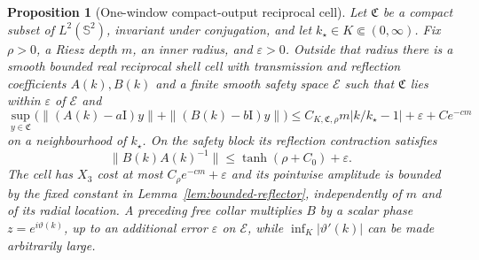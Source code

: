 \documentclass[11pt]{article}
\newtheorem{proposition}[theorem]{Proposition}
\theoremstyle{remark}
\newcommand{\Id}{\mathrm I}
\begin{document}
\begin{proposition}[One-window compact-output reciprocal cell]
\label{prop:one-window-cell}
Let $\mathfrak C$ be a compact subset of
$L^2(\mathbb S^2)$, invariant under conjugation, and let
$k_\star\in K\Subset(0,\infty)$.  Fix $\rho>0$, a Riesz depth $m$, an inner
radius, and $\varepsilon>0$.  Outside that radius there is a smooth bounded
real reciprocal shell cell with transmission and reflection coefficients
$A(k),B(k)$ and a finite smooth safety space $\mathcal E$ such that
$\mathfrak C$ lies within $\varepsilon$ of $\mathcal E$ and
\begin{equation}
 \sup_{y\in\mathfrak C}
 \bigl(\|(A(k)-a\Id)y\|+\|(B(k)-b\Id)y\|\bigr)
 \leq C_{K,\mathfrak C,\rho}m|k/k_\star-1|
       +\varepsilon+Ce^{-cm}
 \label{eq:one-window-residual}
\end{equation}
on a neighbourhood of $k_\star$.  On the safety block its reflection
contraction satisfies
\begin{equation}
 \|B(k)A(k)^{-1}\|
 \leq\tanh(\rho+C_0)+\varepsilon.
 \label{eq:one-window-reflection-gap}
\end{equation}
The cell has $X_3$ cost at most $C_\rho e^{-cm}+\varepsilon$ and its
pointwise amplitude is bounded by the fixed constant in
Lemma~\ref{lem:bounded-reflector}, independently of $m$ and of its radial
location.  A preceding free collar multiplies $B$ by a scalar phase
$z=e^{i\vartheta(k)}$, up to an additional error $\varepsilon$ on
$\mathcal E$, while $\inf_K|\vartheta'(k)|$ can be made arbitrarily large.
\end{proposition}
\end{document}

